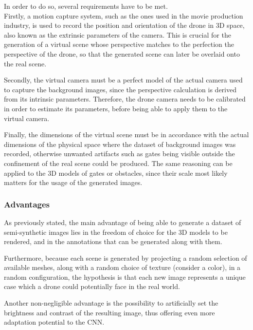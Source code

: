 In order to do so, several requirements have to be met.\\

Firstly, a motion capture system, such as the ones used in the movie production
industry, is used to record the position and orientation of the drone in 3D
space, also known as the extrinsic parameters of the camera. This is crucial
for the generation of a virtual scene whose perspective matches to the
perfection the perspective of the drone, so that the generated scene can later
be overlaid onto the real scene.

Secondly, the virtual camera must be a perfect model of the actual camera used
to capture the background images, since the perspective calculation is derived
from its intrinsic parameters. Therefore, the drone camera needs to be
calibrated in order to estimate its parameters, before being able to apply
them to the virtual camera.

Finally, the dimensions of the virtual scene must be in accordance with the
actual dimensions of the physical space where the dataset of background images
was recorded, otherwise unwanted artifacts such as gates being visible outside
the confinement of the real scene could be produced. The same reasoning can be
applied to the 3D models of gates or obstacles, since their scale most likely
matters for the usage of the generated images.\\

	\subsubsection{Advantages}

As previously stated, the main advantage of being able to generate a dataset of
semi-synthetic images lies in the freedom of choice for the 3D models to be
rendered, and in the annotations that can be generated along with them.

Furthermore, because each scene is generated by projecting a random selection
of available meshes, along with a random choice of texture (consider a color),
in a random configuration, the hypothesis is that each new image represents a
unique case which a drone could potentially face in the real world.

Another non-negligible  advantage is the possibility to artificially set the
brightness and contrast of the resulting image, thus offering even more
adaptation potential to the CNN.\\


